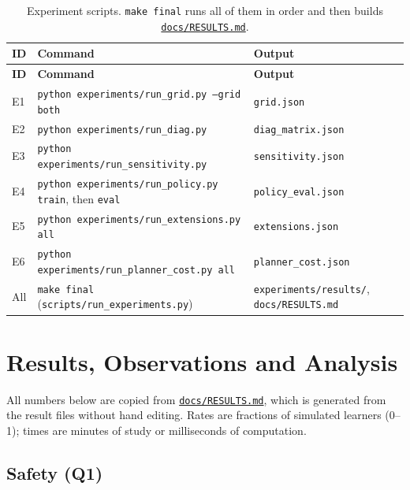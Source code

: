 \documentclass[11pt,a4paper]{article}
\newcommand{\finaltag}{cs5903-final-2026}
\newcommand{\repobase}{https://github.com/vhemanth06/AdaptEngine}
\newcommand{\repo}[1]{\href{\repobase/blob/\finaltag/#1}{\nolinkurl{#1}}}
\begin{document}
\begin{xltabular}{\textwidth}{
    @{}
    >{\raggedright\arraybackslash}p{0.12\textwidth}
    >{\raggedright\arraybackslash}X
    >{\raggedright\arraybackslash}p{0.3\textwidth}
    @{}
}
\caption{Experiment scripts. \texttt{make final} runs all of them in order and then builds \protect\repo{docs/RESULTS.md}.}
\label{tab:scripts}\\
\toprule
\textbf{ID} & \textbf{Command} & \textbf{Output} \\
\midrule
\endfirsthead
\toprule
\textbf{ID} & \textbf{Command} & \textbf{Output} \\
\midrule
\endhead
\bottomrule
\endfoot
E1 & \texttt{python experiments/run\_grid.py --grid both} & \texttt{grid.json} \\
E2 & \texttt{python experiments/run\_diag.py} & \texttt{diag\_matrix.json} \\
E3 & \texttt{python experiments/run\_sensitivity.py} & \texttt{sensitivity.json} \\
E4 & \texttt{python experiments/run\_policy.py train}, then \texttt{eval} & \texttt{policy\_eval.json} \\
E5 & \texttt{python experiments/run\_extensions.py all} & \texttt{extensions.json} \\
E6 & \texttt{python experiments/run\_planner\_cost.py all} & \texttt{planner\_cost.json} \\
All & \texttt{make final} (\texttt{scripts/run\_experiments.py}) & \texttt{experiments/results/}, \texttt{docs/RESULTS.md} \\
\end{xltabular}

\section{Results, Observations and Analysis}

All numbers below are copied from \repo{docs/RESULTS.md}, which is generated from the result files without hand editing. Rates are fractions of simulated learners (0--1); times are minutes of study or milliseconds of computation.

\subsection{Safety (Q1)}
\end{document}
